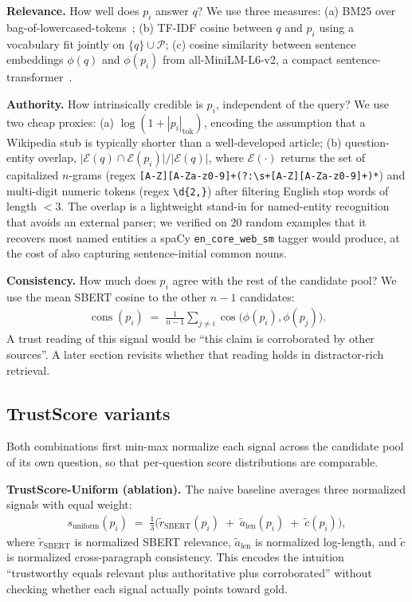 \textbf{Relevance.} How well does $p_i$ answer $q$? We use three
measures: (a) BM25 over bag-of-lowercased-tokens~\cite{robertson2009bm25};
(b) TF-IDF cosine between $q$ and $p_i$ using a vocabulary fit jointly
on $\{q\}\cup\mathcal{P}$; (c) cosine similarity between sentence
embeddings $\phi(q)$ and $\phi(p_i)$ from all-MiniLM-L6-v2, a compact
sentence-transformer~\cite{reimers2019sbert}.

\textbf{Authority.} How intrinsically credible is $p_i$, independent of
the query? We use two cheap proxies: (a) $\log(1+|p_i|_{\text{tok}})$,
encoding the assumption that a Wikipedia stub is typically shorter than
a well-developed article; (b) question-entity overlap,
$\lvert\mathcal{E}(q)\cap\mathcal{E}(p_i)\rvert / \lvert\mathcal{E}(q)\rvert$,
where $\mathcal{E}(\cdot)$ returns the set of capitalized $n$-grams
(regex \texttt{[A-Z][A-Za-z0-9]+(?:\textbackslash s+[A-Z][A-Za-z0-9]+)*})
and multi-digit numeric tokens (regex \texttt{\textbackslash d\{2,\}})
after filtering English stop words of length $< 3$. The overlap is a
lightweight stand-in for named-entity recognition that avoids an
external parser; we verified on 20 random examples that it recovers
most named entities a spaCy \texttt{en\_core\_web\_sm} tagger would
produce, at the cost of also capturing sentence-initial common nouns.

\textbf{Consistency.} How much does $p_i$ agree with the rest of the
candidate pool? We use the mean SBERT cosine to the other $n-1$
candidates:
\begin{align*}
\operatorname{cons}(p_i) \;=\; \tfrac{1}{n-1}\!\sum_{j \ne i} \cos\!\bigl(\phi(p_i),\phi(p_j)\bigr).
\end{align*}
A trust reading of this signal would be ``this claim is corroborated by
other sources''. A later section revisits whether that reading holds in
distractor-rich retrieval.

\subsection{TrustScore variants}

Both combinations first min-max normalize each signal across the
candidate pool of its own question, so that per-question score
distributions are comparable.

\textbf{TrustScore-Uniform (ablation).} The naive baseline averages
three normalized signals with equal weight:
\begin{align*}
s_{\text{uniform}}(p_i) \;=\; \tfrac{1}{3}\!\bigl(\tilde r_{\text{SBERT}}(p_i)\;+\;\tilde a_{\text{len}}(p_i)\;+\;\tilde c(p_i)\bigr),
\end{align*}
where $\tilde r_{\text{SBERT}}$ is normalized SBERT relevance,
$\tilde a_{\text{len}}$ is normalized log-length, and $\tilde c$ is
normalized cross-paragraph consistency. This encodes the intuition
``trustworthy equals relevant plus authoritative plus corroborated''
without checking whether each signal actually points toward gold.

